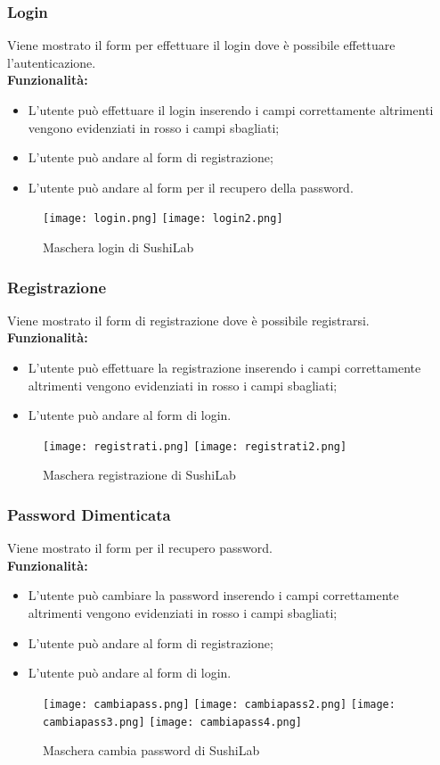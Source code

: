 \subsubsection{Login}
Viene mostrato il form per effettuare il login dove è possibile effettuare l'autenticazione.\\
\textbf{Funzionalità:}
\begin{itemize}
    \item L'utente può effettuare il login inserendo i campi correttamente altrimenti vengono evidenziati in rosso i campi sbagliati;
    \item L'utente può andare al form di registrazione;
    \item L'utente può andare al form per il recupero della password.
\end{itemize}
\begin{figure}[H]
    \centering
    \texttt{[image: login.png]}
    \texttt{[image: login2.png]}
    \caption{Maschera login di SushiLab}
\end{figure}


\subsubsection{Registrazione}
Viene mostrato il form di registrazione dove è possibile registrarsi.\\
\textbf{Funzionalità:}
\begin{itemize}
    \item L'utente può effettuare la registrazione inserendo i campi correttamente altrimenti vengono evidenziati in rosso i campi sbagliati;
    \item L'utente può andare al form di login.
\end{itemize}
\begin{figure}[H]
    \centering
    \texttt{[image: registrati.png]}
    \texttt{[image: registrati2.png]}
    \caption{Maschera registrazione di SushiLab}
\end{figure}


\subsubsection{Password Dimenticata}
Viene mostrato il form per il recupero password.\\
\textbf{Funzionalità:}
\begin{itemize}
    \setlength\itemsep{.1em}
    \item L'utente può cambiare la password inserendo i campi correttamente altrimenti vengono evidenziati in rosso i campi sbagliati;
    \item L'utente può andare al form di registrazione;
    \item L'utente può andare al form di login.
\end{itemize}
\begin{figure}[H]
    \centering
    \texttt{[image: cambiapass.png]}
    \texttt{[image: cambiapass2.png]}
    \texttt{[image: cambiapass3.png]}
    \texttt{[image: cambiapass4.png]}
    \caption{Maschera cambia password di SushiLab}
\end{figure}


